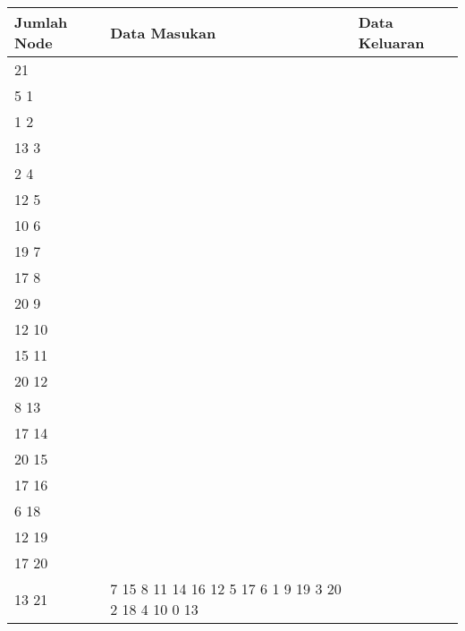 	\begin{longtable}[Ht]{| p{} | p{} | p{} |}
		\hline
		Jumlah Node & Data Masukan                                                                                                                                                                                                                          & Data Keluaran                                                          \\ \hline
	21          & \begin{tabular}[c]{@{}l@{}}21\\ 5 1\\ 1 2\\ 13 3\\ 2 4\\ 12 5\\ 10 6\\ 19 7\\ 17 8\\ 20 9\\ 12 10\\ 15 11\\ 20 12\\ 8 13\\ 17 14\\ 20 15\\ 17 16\\ 6 18\\ 12 19\\ 17 20\\ 13 21\end{tabular}                                          & 7 15 8 11 14 16 12 5 17 6 1 9 19 3 20 2 18 4 10 0 13                   \\ \hline
	\end{longtable}
	\pagebreak
